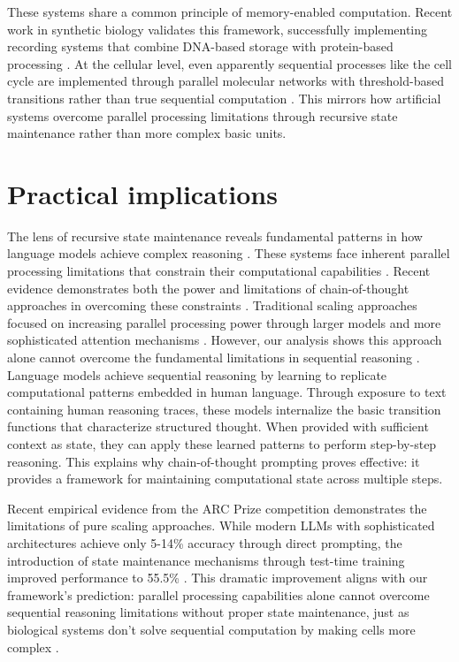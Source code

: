 \documentclass[12pt]{article}
\begin{document}
These systems share a common principle of memory-enabled computation.
Recent work in synthetic biology validates this framework, successfully implementing recording systems that combine DNA-based storage with protein-based processing \cite{sheth2017multiplex}.
At the cellular level, even apparently sequential processes like the cell cycle are implemented through parallel molecular networks with threshold-based transitions rather than true sequential computation \cite{alberts2022molecular}.
This mirrors how artificial systems overcome parallel processing limitations through recursive state maintenance rather than more complex basic units.

\section{Practical implications}

The lens of recursive state maintenance reveals fundamental patterns in how language models achieve complex reasoning \cite{dickson2024trust,ahn2024recursive,openai2024o1}.
These systems face inherent parallel processing limitations that constrain their computational capabilities \cite{merrill2023parallelism}.
Recent evidence demonstrates both the power and limitations of chain-of-thought approaches in overcoming these constraints \cite{liu2024mind}.
Traditional scaling approaches focused on increasing parallel processing power through larger models and more sophisticated attention mechanisms \cite{shallue2019measuring}.
However, our analysis shows this approach alone cannot overcome the fundamental limitations in sequential reasoning \cite{peng2024limitations}.
Language models achieve sequential reasoning by learning to replicate computational patterns embedded in human language.
Through exposure to text containing human reasoning traces, these models internalize the basic transition functions that characterize structured thought.
When provided with sufficient context as state, they can apply these learned patterns to perform step-by-step reasoning.
This explains why chain-of-thought prompting proves effective: it provides a framework for maintaining computational state across multiple steps.

Recent empirical evidence from the ARC Prize competition demonstrates the limitations of pure scaling approaches.
While modern LLMs with sophisticated architectures achieve only 5-14\% accuracy through direct prompting, the introduction of state maintenance mechanisms through test-time training improved performance to 55.5\% \cite{chollet2024arc}.
This dramatic improvement aligns with our framework's prediction: parallel processing capabilities alone cannot overcome sequential reasoning limitations without proper state maintenance, just as biological systems don't solve sequential computation by making cells more complex \cite{wang2023parallel}.
\end{document}
